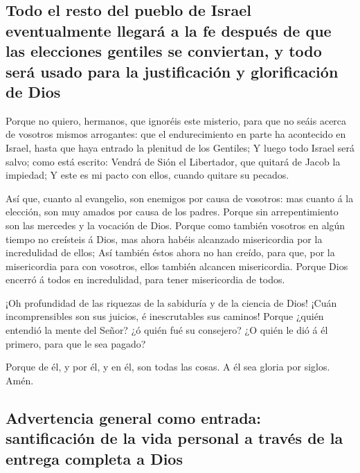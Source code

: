 \hypertarget{todo-el-resto-del-pueblo-de-israel-eventualmente-llegaruxe1-a-la-fe-despuuxe9s-de-que-las-elecciones-gentiles-se-conviertan-y-todo-seruxe1-usado-para-la-justificaciuxf3n-y-glorificaciuxf3n-de-dios}{%
\subsection{Todo el resto del pueblo de Israel eventualmente llegará a
la fe después de que las elecciones gentiles se conviertan, y todo será
usado para la justificación y glorificación de
Dios}\label{todo-el-resto-del-pueblo-de-israel-eventualmente-llegaruxe1-a-la-fe-despuuxe9s-de-que-las-elecciones-gentiles-se-conviertan-y-todo-seruxe1-usado-para-la-justificaciuxf3n-y-glorificaciuxf3n-de-dios}}

 Porque no quiero, hermanos, que ignoréis este misterio,
para que no seáis acerca de vosotros mismos arrogantes: que el
endurecimiento en parte ha acontecido en Israel, hasta que haya entrado
la plenitud de los Gentiles;  Y luego todo Israel será
salvo; como está escrito: Vendrá de Sión el Libertador, que quitará de
Jacob la impiedad;  Y este es mi pacto con ellos, cuando
quitare su pecados.

 Así que, cuanto al evangelio, son enemigos por causa de
vosotros: mas cuanto á la elección, son muy amados por causa de los
padres.  Porque sin arrepentimiento son las mercedes y la
vocación de Dios.  Porque como también vosotros en algún
tiempo no creísteis á Dios, mas ahora habéis alcanzado misericordia por
la incredulidad de ellos;  Así también éstos ahora no han
creído, para que, por la misericordia para con vosotros, ellos también
alcancen misericordia.  Porque Dios encerró á todos en
incredulidad, para tener misericordia de todos.

 ¡Oh profundidad de las riquezas de la sabiduría y de la
ciencia de Dios! ¡Cuán incomprensibles son sus juicios, é inescrutables
sus caminos!  Porque ¿quién entendió la mente del Señor? ¿ó
quién fué su consejero?  ¿O quién le dió á él primero, para
que le sea pagado?

 Porque de él, y por él, y en él, son todas las cosas. A él
sea gloria por siglos. Amén.

\hypertarget{advertencia-general-como-entrada-santificaciuxf3n-de-la-vida-personal-a-travuxe9s-de-la-entrega-completa-a-dios}{%
\subsection{Advertencia general como entrada: santificación de la vida
personal a través de la entrega completa a
Dios}\label{advertencia-general-como-entrada-santificaciuxf3n-de-la-vida-personal-a-travuxe9s-de-la-entrega-completa-a-dios}}

